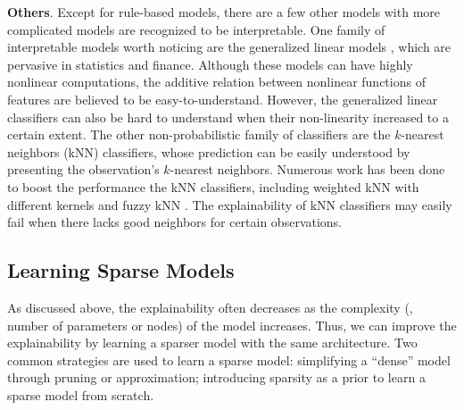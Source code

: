 \textbf{Others}. Except for rule-based models, there are a few other models with more complicated models are recognized to be interpretable.
One family of interpretable models worth noticing are the generalized linear models \cite{debock2010gam}, which are pervasive in statistics and finance. Although these models can have highly nonlinear computations, the additive relation between nonlinear functions of features are believed to be easy-to-understand. However, the generalized linear classifiers can also be hard to understand when their non-linearity increased to a certain extent. The other non-probabilistic family of classifiers are the $k$-nearest neighbors (kNN) classifiers, whose prediction can be easily understood by presenting the observation's $k$-nearest neighbors. Numerous work has been done to boost the performance the kNN classifiers, including weighted kNN with different kernels \cite{dudani1976weightedknn} and fuzzy kNN \cite{keller1985fuzzyknn}. The explainability of kNN classifiers may easily fail when there lacks good neighbors for certain observations.







\subsection{Learning Sparse Models}

As discussed above, the explainability often decreases as the complexity (\ie, number of parameters or nodes) of the model increases. Thus, we can improve the explainability by learning a sparser model with the same architecture. Two common strategies are used to learn a sparse model: simplifying a ``dense'' model through pruning or approximation; introducing sparsity as a prior to learn a sparse model from scratch. 

